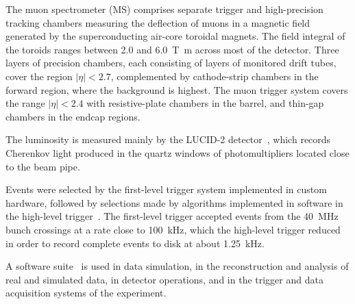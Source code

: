 The muon spectrometer (MS) comprises separate trigger and
high-precision tracking chambers measuring the deflection of muons in a magnetic field generated by the superconducting air-core toroidal magnets.
The field integral of the toroids ranges between \num{2.0} and \qty{6.0}{\tesla\metre}
across most of the detector. 
Three layers of precision chambers, each consisting of layers of monitored drift tubes, cover the region \(|\eta| < 2.7\),
complemented by cathode-strip chambers in the forward region, where the background is highest.
The muon trigger system covers the range \(|\eta| < 2.4\) with resistive-plate chambers in the barrel, and thin-gap chambers in the endcap regions.

The luminosity is measured mainly by the LUCID-2 detector~\cite{LUCID2}, which records Cherenkov light produced in the quartz windows of photomultipliers located close to the beam pipe.

Events were selected by the first-level trigger system implemented in custom hardware,
followed by selections made by algorithms implemented in software in the high-level trigger~\cite{TRIG-2016-01}. 
The first-level trigger accepted events from the \qty{40}{\MHz} bunch crossings at a rate close to \qty{100}{\kHz},
which the high-level trigger reduced in order to record complete events to disk at about \qty{1.25}{\kHz}.

A software suite~\cite{SOFT-2022-02} is used in data simulation, in the reconstruction
and analysis of real and simulated data, in detector operations, and in the trigger and data acquisition
systems of the experiment.


